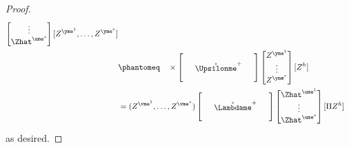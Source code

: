 \documentclass[main.tex]{subfiles}
\begin{document}
\begin{proof}
\begin{align*}
\begin{bmatrix}
  \vdots\\
  \Zhat^{\ume^s}
  \end{bmatrix}
  [Z^{\yme^1},
    \ldots,
     Z^{\yme^r}
  ]
  \\
&\phantomeq\quad
  \times
  \begin{bmatrix}
  \phz
    &\phz
      &\phz\\
  \phz
    &\mathring{\Upsilonme }^+
      &\phz\\
  \phz
    &\phz
      &\phz
  \end{bmatrix}
  \begin{bmatrix}
     Z^{\yme^1}\\
    \vdots\\
     Z^{\yme^r}
  \end{bmatrix}
     [Z^{h}]
  \\
&=
  ( Z^{\vme^1},
  \ldots,
   Z^{\vme^s})
  \begin{bmatrix}
  \phz
    &\phz
      &\phz\\
  \phz
    &\mathring{\Lambdame }^+
      &\phz\\
  \phz
    &\phz
      &\phz
  \end{bmatrix}
  \begin{bmatrix}
  \Zhat^{\ume^1}\\
  \vdots\\
  \Zhat^{\ume^s}
  \end{bmatrix}
  [\Pi  Z^{h}]
\end{align*}
as desired.
\end{proof}
\end{document}

